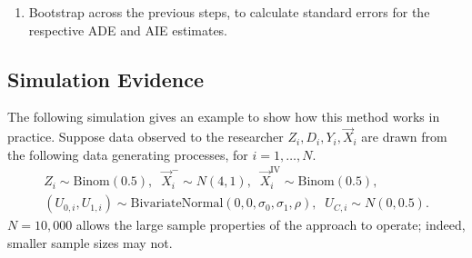 \begin{enumerate}
    \item Bootstrap across the previous steps, to calculate standard errors for the respective ADE and AIE estimates.
\end{enumerate}

\subsection{Simulation Evidence}
The following simulation gives an example to show how this method works in practice.
Suppose data observed to the researcher $Z_i, D_i, Y_i, \vec X_i$ are drawn from the following data generating processes, for $i = 1, \hdots, N$.
\begin{align*}
    Z_i \sim \text{Binom}\left(0.5 \right),
    \;\; \vec X_i^- \sim N(4, 1),
    \;\; \vec X_i^{\text{IV}} \sim \text{Binom}\left( 0.5 \right), \\
    \left( U_{0,i}, U_{1,i} \right) \sim
    \text{BivariateNormal}\left( 0, 0, \sigma_0, \sigma_1, \rho \right),
    \;\; U_{C,i} \sim N(0, 0.5).
\end{align*}
$N = 10,000$ allows the large sample properties of the approach to operate; indeed, smaller sample sizes may not.

